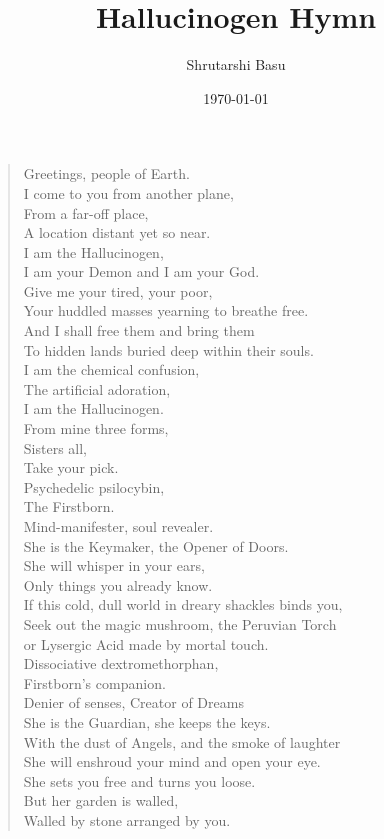 \documentclass[11pt,letterpaper]{article}
\title{Hallucinogen Hymn}
\author{Shrutarshi Basu}
\date{\today}
\begin{document}
\maketitle
\begin{verse}


Greetings, people of Earth.\\
I come to you from another plane,\\
From a far-off place,\\
A location distant yet so near.\\
I am the Hallucinogen,\\
I am your Demon and I am your God.\\
Give me your tired, your poor,\\
Your huddled masses yearning to breathe free.\\
And I shall free them and bring them\\
To hidden lands buried deep within their souls.\\
I am the chemical confusion,\\
The artificial adoration,\\
I am the Hallucinogen.\\

From mine three forms,\\
Sisters all,\\
Take your pick.\\

Psychedelic psilocybin,\\
The Firstborn.\\
Mind-manifester, soul revealer.\\
She is the Keymaker, the Opener of Doors.\\
She will whisper in your ears,\\
Only things you already know.\\
If this cold, dull world in dreary shackles binds you,\\
Seek out the magic mushroom, the Peruvian Torch\\
or Lysergic Acid made by mortal touch.\\

Dissociative dextromethorphan,\\
Firstborn's companion.\\
Denier of senses, Creator of Dreams\\
She is the Guardian, she keeps the keys.\\
With the dust of Angels, and the smoke of laughter\\
She will enshroud your mind and open your eye.\\
She sets you free and turns you loose.\\
But her garden is walled,\\
Walled by stone arranged by you.\\


\end{verse}
\end{document}
